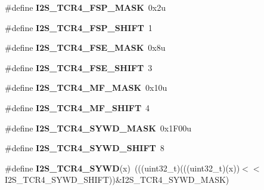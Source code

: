 \begin{DoxyCompactItemize}
\item 
\#define {\bfseries I2\+S\+\_\+\+T\+C\+R4\+\_\+\+F\+S\+P\+\_\+\+M\+A\+SK}~0x2u\hypertarget{group__I2S__Register__Masks_ga040aed413399e30e47219d040ff46c9d}{}\label{group__I2S__Register__Masks_ga040aed413399e30e47219d040ff46c9d}

\item 
\#define {\bfseries I2\+S\+\_\+\+T\+C\+R4\+\_\+\+F\+S\+P\+\_\+\+S\+H\+I\+FT}~1\hypertarget{group__I2S__Register__Masks_ga48dba321e9103f28b6b66b072dae99b7}{}\label{group__I2S__Register__Masks_ga48dba321e9103f28b6b66b072dae99b7}

\item 
\#define {\bfseries I2\+S\+\_\+\+T\+C\+R4\+\_\+\+F\+S\+E\+\_\+\+M\+A\+SK}~0x8u\hypertarget{group__I2S__Register__Masks_ga1431c095df0a4ca821052d83ca72ca96}{}\label{group__I2S__Register__Masks_ga1431c095df0a4ca821052d83ca72ca96}

\item 
\#define {\bfseries I2\+S\+\_\+\+T\+C\+R4\+\_\+\+F\+S\+E\+\_\+\+S\+H\+I\+FT}~3\hypertarget{group__I2S__Register__Masks_ga967f80d877a02e10cfe3041c0547c67f}{}\label{group__I2S__Register__Masks_ga967f80d877a02e10cfe3041c0547c67f}

\item 
\#define {\bfseries I2\+S\+\_\+\+T\+C\+R4\+\_\+\+M\+F\+\_\+\+M\+A\+SK}~0x10u\hypertarget{group__I2S__Register__Masks_ga3331c691867adbb231a8d1d7ccb4ce94}{}\label{group__I2S__Register__Masks_ga3331c691867adbb231a8d1d7ccb4ce94}

\item 
\#define {\bfseries I2\+S\+\_\+\+T\+C\+R4\+\_\+\+M\+F\+\_\+\+S\+H\+I\+FT}~4\hypertarget{group__I2S__Register__Masks_ga63d02d7aac86c3c6389035e2e3a8a96b}{}\label{group__I2S__Register__Masks_ga63d02d7aac86c3c6389035e2e3a8a96b}

\item 
\#define {\bfseries I2\+S\+\_\+\+T\+C\+R4\+\_\+\+S\+Y\+W\+D\+\_\+\+M\+A\+SK}~0x1\+F00u\hypertarget{group__I2S__Register__Masks_ga239e1c4ba761520bf2d7e0cf65c39d54}{}\label{group__I2S__Register__Masks_ga239e1c4ba761520bf2d7e0cf65c39d54}

\item 
\#define {\bfseries I2\+S\+\_\+\+T\+C\+R4\+\_\+\+S\+Y\+W\+D\+\_\+\+S\+H\+I\+FT}~8\hypertarget{group__I2S__Register__Masks_gadd23753698d7fb9a8948b1db0443fa4f}{}\label{group__I2S__Register__Masks_gadd23753698d7fb9a8948b1db0443fa4f}

\item 
\#define {\bfseries I2\+S\+\_\+\+T\+C\+R4\+\_\+\+S\+Y\+WD}(x)~(((uint32\+\_\+t)(((uint32\+\_\+t)(x))$<$$<$I2\+S\+\_\+\+T\+C\+R4\+\_\+\+S\+Y\+W\+D\+\_\+\+S\+H\+I\+FT))\&I2\+S\+\_\+\+T\+C\+R4\+\_\+\+S\+Y\+W\+D\+\_\+\+M\+A\+SK)\hypertarget{group__I2S__Register__Masks_ga3d6d1dade93eeda4a8a6914f60cbb9fc}{}\label{group__I2S__Register__Masks_ga3d6d1dade93eeda4a8a6914f60cbb9fc}


\end{DoxyCompactItemize}
